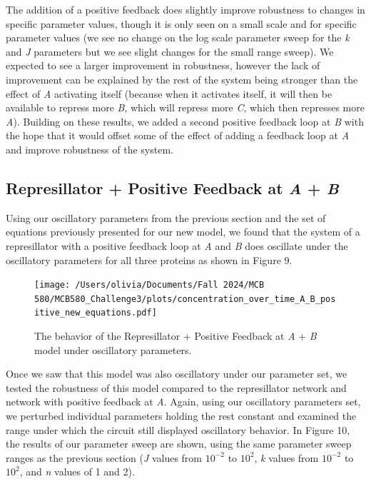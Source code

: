 \documentclass{article}
\begin{document}
The addition of a positive feedback does slightly improve robustness to changes in specific parameter values, though it is only seen on a small scale and for specific parameter values (we see no change on the log scale parameter sweep for the \textit{k} and \textit{J} parameters but we see slight changes for the small range sweep). We expected to see a larger improvement in robustness, however the lack of improvement can be explained by the rest of the system being stronger than the effect of \textit{A} activating itself (because when it activates itself, it will then be available to repress more \textit{B}, which will repress more \textit{C}, which then represses more \textit{A}). Building on these results, we added a second positive feedback loop at \textit{B} with the hope that it would offset some of the effect of adding a feedback loop at \textit{A} and improve robustness of the system.  

\subsection{Represillator + Positive Feedback at \textit{A} + \textit{B}}

Using our oscillatory parameters from the previous section and the set of equations previously presented for our new model, we found that the system of a represillator with a positive feedback loop at \textit{A} and \textit{B} does oscillate under the oscillatory parameters for all three proteins as shown in Figure 9. 

\begin{figure}[H]
    \centering
    \texttt{[image: /Users/olivia/Documents/Fall 2024/MCB 580/MCB580\_Challenge3/plots/concentration\_over\_time\_A\_B\_positive\_new\_equations.pdf]}
    \caption{The behavior of the Represillator + Positive Feedback at \textit{A} + \textit{B} model under oscillatory parameters.}
    \label{fig:9}
\end{figure}



Once we saw that this model was also oscillatory under our parameter set, we tested the robustness of this model compared to the represillator network and network with positive feedback at \textit{A}. Again, using our oscillatory parameters set, we perturbed individual parameters holding the rest constant and examined the range under which the circuit still displayed oscillatory behavior. In Figure 10, the results of our parameter sweep are shown, using the same parameter sweep ranges as the previous section (\textit{J} values from \( 10^{-2} \) to \( 10^{2} \), \textit{k} values from \( 10^{-2} \) to \( 10^{2} \), and \textit{n} values of 1 and 2). 
\end{document}
